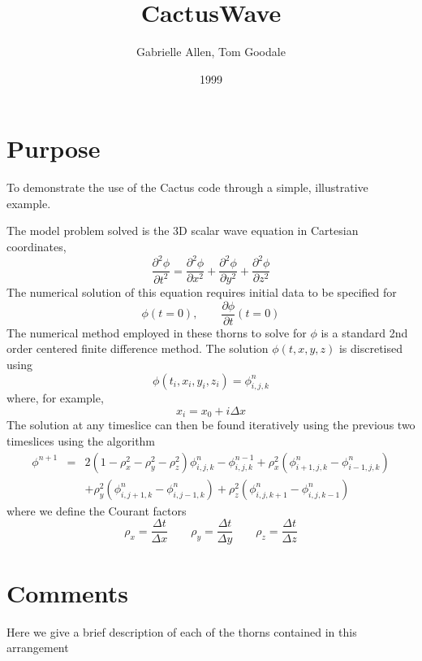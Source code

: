 \documentclass{article}
\begin{document}
\title{CactusWave}
\author{Gabrielle Allen, Tom Goodale}
\date{1999}
\maketitle


\section{Purpose}

To demonstrate the use of the Cactus code through a simple, illustrative
example.

The model problem solved is the 3D scalar wave equation in 
Cartesian coordinates,
$$
\frac{\partial^2 \phi}{\partial t^2} =
  \frac{\partial^2 \phi}{\partial x^2} +
  \frac{\partial^2 \phi}{\partial y^2} +
  \frac{\partial^2 \phi}{\partial z^2} 
$$
The numerical solution of this equation requires initial data
to be specified for
$$
\phi(t=0), \qquad \frac{\partial \phi}{\partial t}(t=0)
$$
The numerical method employed in these thorns to solve for $\phi$
is a standard 2nd order centered finite difference method.
The solution $\phi(t,x,y,z)$ is discretised using
$$
  \phi(t_i,x_i,y_i,z_i) = \phi^n_{i,j,k}
$$
where, for example,
$$
x_i = x_0 + i \Delta x
$$
The solution at any timeslice can then be found iteratively 
using the previous two timeslices using the algorithm
\begin{eqnarray}
\phi^{n+1} &=& 
2(1- \rho_x^2 - \rho_y^2 - \rho_z^2) \phi^n_{i,j,k}
-\phi^{n-1}_{i,j,k} 
+ \rho_x^2(\phi^n_{i+1,j,k}-\phi^n_{i-1,j,k})
\nonumber\\
&&+ \rho_y^2(\phi^n_{i,j+1,k}-\phi^n_{i,j-1,k})
+ \rho_z^2(\phi^n_{i,j,k+1}-\phi^n_{i,j,k-1})
\end{eqnarray}
where we define the Courant factors
$$
\rho_x = \frac{\Delta t}{\Delta x} \qquad
\rho_y = \frac{\Delta t}{\Delta y} \qquad
\rho_z = \frac{\Delta t}{\Delta z}
$$

\section{Comments}

Here we give a brief description of each of the thorns contained in
this arrangement
\end{document}
